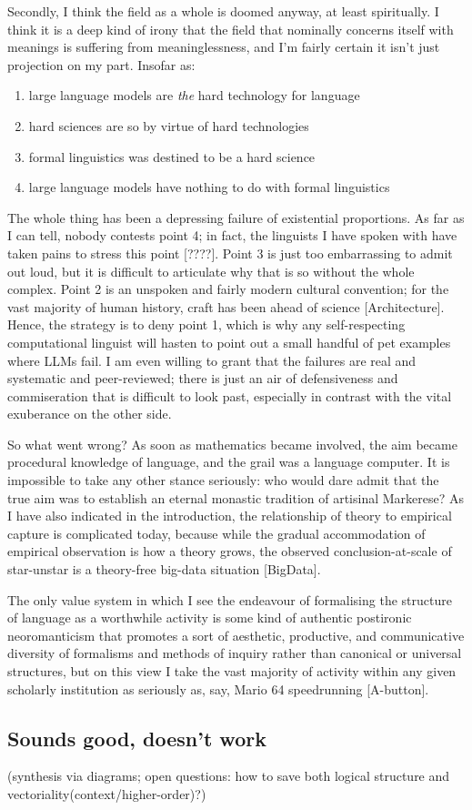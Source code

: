Secondly, I think the field as a whole is doomed anyway, at least spiritually. I think it is a deep kind of irony that the field that nominally concerns itself with meanings is suffering from meaninglessness, and I'm fairly certain it isn't just projection on my part. Insofar as:
\begin{enumerate}
\item large language models are \emph{the} hard technology for language
\item hard sciences are so by virtue of hard technologies
\item formal linguistics was destined to be a hard science
\item large language models have nothing to do with formal linguistics
\end{enumerate}
The whole thing has been a depressing failure of existential proportions. As far as I can tell, nobody contests point 4; in fact, the linguists I have spoken with have taken pains to stress this point [????]. Point 3 is just too embarrassing to admit out loud, but it is difficult to articulate why that is so without the whole complex. Point 2 is an unspoken and fairly modern cultural convention; for the vast majority of human history, craft has been ahead of science [Architecture]. Hence, the strategy is to deny point 1, which is why any self-respecting computational linguist will hasten to point out a small handful of pet examples where LLMs fail. I am even willing to grant that the failures are real and systematic and peer-reviewed; there is just an air of defensiveness and commiseration that is difficult to look past, especially in contrast with the vital exuberance on the other side.

So what went wrong? As soon as mathematics became involved, the aim became procedural knowledge of language, and the grail was a language computer. It is impossible to take any other stance seriously: who would dare admit that the true aim was to establish an eternal monastic tradition of artisinal Markerese? As I have also indicated in the introduction, the relationship of theory to empirical capture is complicated today, because while the gradual accommodation of empirical observation is how a theory grows, the observed conclusion-at-scale of star-unstar is a theory-free big-data situation [BigData].

The only value system in which I see the endeavour of formalising the structure of language as a worthwhile activity is some kind of authentic postironic neoromanticism that promotes a sort of aesthetic, productive, and communicative diversity of formalisms and methods of inquiry rather than canonical or universal structures, but on this view I take the vast majority of activity within any given scholarly institution as seriously as, say, Mario 64 speedrunning [A-button].

\subsection{Sounds good, doesn't work}

(synthesis via diagrams; open questions: how to save both logical structure and vectoriality(context/higher-order)?)